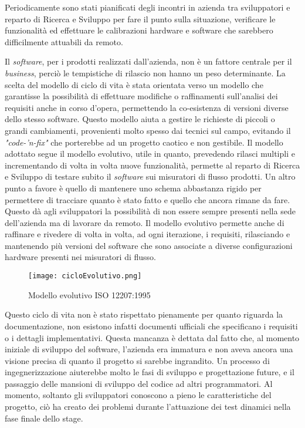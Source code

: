 Periodicamente sono stati pianificati degli incontri in azienda tra sviluppatori e reparto di Ricerca e Sviluppo per fare il punto sulla situazione, verificare le funzionalità ed effettuare le calibrazioni hardware e software che sarebbero difficilmente attuabili da remoto.

Il \textit{software}, per i prodotti realizzati dall'azienda, non è un fattore centrale per il \textit{business}, perciò le tempistiche di rilascio non hanno un peso determinante. La scelta del modello di ciclo di vita è stata orientata verso un modello che garantisse la possibilità di effettuare modifiche o raffinamenti sull'analisi dei requisiti anche in corso d'opera, permettendo la co-esistenza di versioni diverse dello stesso software. Questo modello aiuta a gestire le richieste di piccoli o grandi cambiamenti, provenienti molto spesso dai tecnici sul campo, evitando il \textit{"code-'n-fix"} che porterebbe ad un progetto caotico e non gestibile.
Il modello adottato segue il modello evolutivo, utile in quanto, prevedendo rilasci multipli e incrementando di volta in volta nuove funzionalità, permette al reparto di Ricerca e Sviluppo di testare subito il \textit{software} sui misuratori di flusso prodotti. Un altro punto a favore è quello di mantenere uno schema abbastanza rigido per permettere di tracciare quanto è stato fatto e quello che ancora rimane da fare. Questo dà agli sviluppatori la possibilità di non essere sempre presenti nella sede dell'azienda ma di lavorare da remoto.
Il modello evolutivo permette anche di raffinare e rivedere di volta in volta, ad ogni iterazione, i requisiti, rilasciando e mantenendo più versioni del software che sono associate a diverse configurazioni hardware presenti nei misuratori di flusso.
\begin{figure}[H]
  \centering
  \texttt{[image: cicloEvolutivo.png]}
  \caption{Modello evolutivo ISO 12207:1995}
\end{figure}

Questo ciclo di vita non è stato rispettato pienamente per quanto riguarda la documentazione, non esistono infatti documenti ufficiali che specificano i requisiti o i dettagli implementativi. Questa mancanza è dettata dal fatto che, al momento iniziale di sviluppo del software, l'azienda era immatura e non aveva ancora una visione precisa di quanto il progetto si sarebbe ingrandito. Un processo di ingegnerizzazione aiuterebbe molto le fasi di sviluppo e progettazione future, e il passaggio delle mansioni di sviluppo del codice ad altri programmatori. Al momento, soltanto gli sviluppatori conoscono a pieno le caratteristiche del progetto, ciò ha creato dei problemi durante l'attuazione dei test dinamici nella fase finale dello stage.




